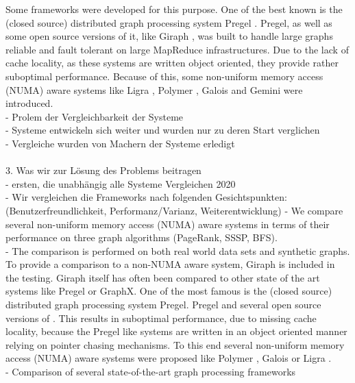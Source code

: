 Some frameworks were developed for this purpose.
One of the best known is the (closed source) distributed graph processing system Pregel \cite{pregel}.
Pregel, as well as some open source versions of it, like Giraph \cite{Giraph}, was built to handle large graphs reliable and fault tolerant on large MapReduce infrastructures.
Due to the lack of cache locality, as these systems are written object oriented, they provide rather suboptimal performance.
Because of this, some non-uniform memory access (NUMA) aware systems like Ligra \cite{Ligra}, Polymer \cite{Polymer}, Galois \cite{Galois} and Gemini \cite{Gemini} were introduced.
\\
- Prolem der Vergleichbarkeit der Systeme\\
- Systeme entwickeln sich weiter und wurden nur zu deren Start verglichen\\
- Vergleiche wurden von Machern der Systeme erledigt\\
\\
3. Was wir zur Lösung des Problems beitragen\\
- ersten, die unabhängig alle Systeme Vergleichen 2020\\
- Wir vergleichen die Frameworks nach folgenden Gesichtspunkten:\\
(Benutzerfreundlichkeit, Performanz/Varianz, Weiterentwicklung)
- We compare several non-uniform memory access (NUMA) aware systems in terms of their performance on three graph algorithms (PageRank, SSSP, BFS).\\
- The comparison is performed on both real world data sets and synthetic graphs.
To provide a comparison to a non-NUMA aware system, Giraph\cite{Giraph} is included in the testing. Giraph itself has often been compared to other state of the art systems like Pregel or GraphX.
One of the most famous is the (closed source) distributed graph processing system Pregel. Pregel and several open source versions of .
This results in suboptimal performance, due to missing cache locality, because the Pregel like systems are written in an object oriented manner relying on pointer chasing mechanisms. To this end several non-uniform memory access (NUMA) aware systems were proposed like Polymer \cite{Polymer}, Galois \cite{Galois} or Ligra \cite{Ligra}.\\
- Comparison of several state-of-the-art graph processing frameworks\\
\\



